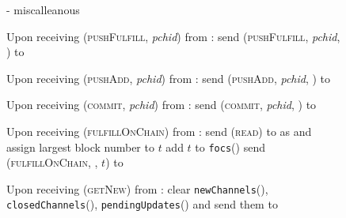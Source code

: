   \begin{figure}[H]
    \begin{systembox}{\fpaynet - miscalleanous}
      \begin{algorithmic}[1]
        \State Upon receiving (\textsc{pushFulfill}, \textit{pchid}) from
        \alice:
        \Indent
          \State send (\textsc{pushFulfill}, \textit{pchid}, \alice) to
          \simulator
        \EndIndent
        \Statex

        \State Upon receiving (\textsc{pushAdd}, \textit{pchid}) from \alice:
        \Indent
          \State send (\textsc{pushAdd}, \textit{pchid}, \alice) to \simulator
        \EndIndent
        \Statex

        \State Upon receiving (\textsc{commit}, \textit{pchid}) from \alice:
        \Indent
          \State send (\textsc{commit}, \textit{pchid}, \alice) to \simulator
        \EndIndent
        \Statex

        \State Upon receiving (\textsc{fulfillOnChain}) from \alice:
        \Indent
          \State send (\textsc{read}) to \ledger{} as \alice{} and assign
          largest block number to $t$
          \State add $t$ to \texttt{focs}(\alice)
          \State send (\textsc{fulfillOnChain}, \alice, $t$) to \simulator
        \EndIndent
        \Statex

        \State Upon receiving (\textsc{getNew}) from \alice:
        \Indent
          \State clear \texttt{newChannels}(\alice),
          \texttt{closedChannels}(\alice), \texttt{pendingUpdates}(\alice) and
          send them to \alice
        \EndIndent
      \end{algorithmic}
    \end{systembox}
    \caption{}
    \label{alg:fpaynet:misc}
  \end{figure}
